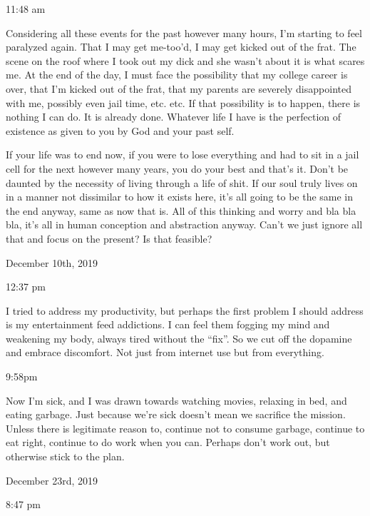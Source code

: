 11:48 am

Considering all these events for the past however many hours, I'm
starting to feel paralyzed again. That I may get me-too'd, I may get
kicked out of the frat. The scene on the roof where I took out my dick
and she wasn't about it is what scares me. At the end of the day, I must
face the possibility that my college career is over, that I'm kicked out
of the frat, that my parents are severely disappointed with me, possibly
even jail time, etc. etc. If that possibility is to happen, there is
nothing I can do. It is already done. Whatever life I have is the
perfection of existence as given to you by God and your past self.

\qquad If your life was to end now, if you were to lose everything and
had to sit in a jail cell for the next however many years, you do your
best and that's it. Don't be daunted by the necessity of living through
a life of shit. If our soul truly lives on in a manner not dissimilar to
how it exists here, it's all going to be the same in the end anyway,
same as now that is. All of this thinking and worry and bla bla bla,
it's all in human conception and abstraction anyway. Can't we just
ignore all that and focus on the present? Is that feasible?

\bigskip
\bigskip
December 10th, 2019

12:37 pm

I tried to address my productivity, but perhaps the first problem I
should address is my entertainment feed addictions. I can feel them
fogging my mind and weakening my body, always tired without the ``fix''.
So we cut off the dopamine and embrace discomfort. Not just from
internet use but from everything.

9:58pm

Now I'm sick, and I was drawn towards watching movies, relaxing in bed,
and eating garbage. Just because we're sick doesn't mean we sacrifice
the mission. Unless there is legitimate reason to, continue not to
consume garbage, continue to eat right, continue to do work when you
can. Perhaps don't work out, but otherwise stick to the plan.

\bigskip
\bigskip
December 23rd, 2019

8:47 pm

